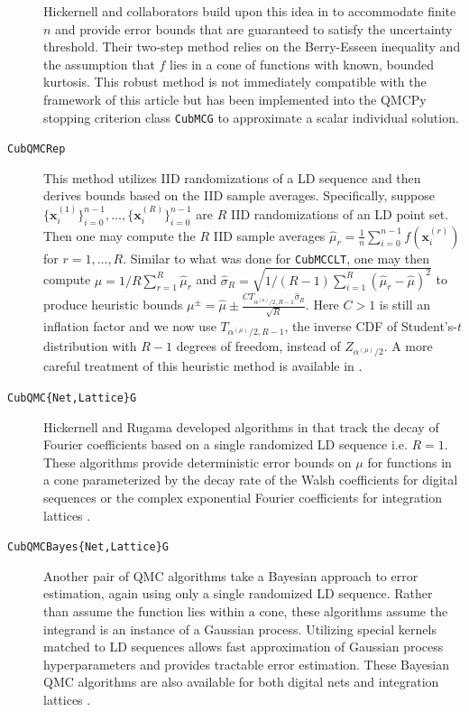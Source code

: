 \documentclass[graybox]{svmult}
\begin{document}
\begin{description}
    Hickernell and collaborators build upon this idea in \cite{cubmcg} to accommodate  finite $n$ and provide error bounds that are guaranteed to satisfy the uncertainty threshold. Their two-step method relies on the Berry-Esseen inequality and the assumption that $f$ lies in a cone of functions with known, bounded kurtosis. This robust method is not immediately compatible with the framework of this article but has been implemented into the QMCPy stopping criterion class \texttt{CubMCG} to approximate a scalar individual solution.
    \item[\texttt{CubQMCRep}] This method utilizes IID randomizations of a LD sequence and then derives bounds based on the IID sample averages. Specifically, suppose $\{\boldsymbol{x}_i^{(1)}\}_{i=0}^{n-1},\dots,\{\boldsymbol{x}_i^{(R)}\}_{i=0}^{n-1}$ are $R$ IID randomizations of an LD point set. Then one may compute the $R$ IID sample averages $\hat{\mu}_r = \frac{1}{n} \sum_{i=0}^{n-1} f(\boldsymbol{x}_i^{(r)})$ for $r = 1,\dots,R$. Similar to what was done for \texttt{CubMCCLT}, one may then compute $\hat{\mu} = 1/R \sum_{r=1}^R \hat{\mu}_r$ and $\hat{\sigma}_R = \sqrt{1/(R-1)\sum_{i=1}^R(\hat{\mu}_r - \hat{\mu})^2}$ to produce heuristic bounds $\mu^\pm = \hat{\mu} \pm \frac{C T_{\alpha^{(\mu)}/2,R-1} \hat{\sigma}_R}{\sqrt{R}}$. Here $C>1$ is still an inflation factor and we now use $T_{\alpha^{(\mu)}/2,R-1}$, the inverse CDF of Student's-$t$ distribution with $R-1$ degrees of freedom, instead of $Z_{\alpha^{(\mu)}/2}$.
    A more careful treatment of this heuristic method is available in \cite{qmc4pde}. 
    \item[\texttt{CubQMC\{Net,Lattice\}G}] Hickernell and Rugama developed algorithms in \cite{adaptive_qmc} that track the decay of Fourier coefficients based on a single randomized LD sequence i.e. $R=1$. These algorithms provide deterministic error bounds on $\mu$ for functions in a cone parameterized by the decay rate of the Walsh coefficients for digital sequences \cite{cubqmcsobol} or the complex exponential Fourier coefficients for integration lattices \cite{cubqmclattice}. 
    \item[\texttt{CubQMCBayes\{Net,Lattice\}G}] Another pair of QMC algorithms take a Bayesian approach to error estimation, again using only a single randomized LD sequence. Rather than assume the function lies within a cone, these algorithms assume the integrand is an instance of a Gaussian process. Utilizing special kernels matched to LD sequences allows fast approximation of Gaussian process hyperparameters and provides tractable error estimation. These Bayesian QMC algorithms are also available for both digital nets \cite{cubqmcbayes_thesis} and integration lattices  \cite{cubqmcbayeslattice}. 
\end{description}
\end{document}
